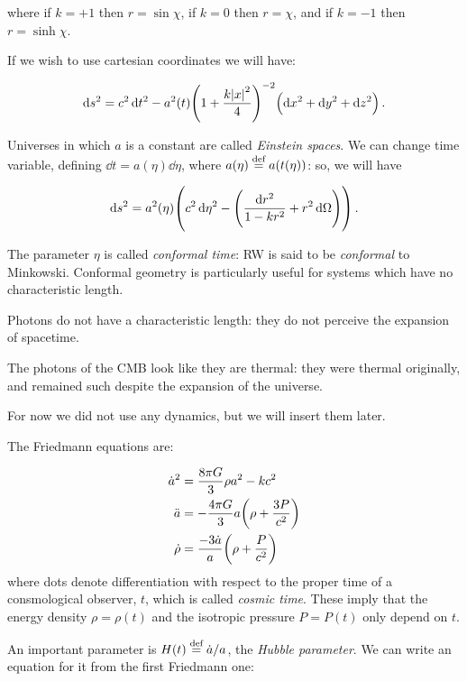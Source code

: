 \documentclass[main.tex]{subfiles}
\begin{document}
where if \(k = +1\)  then \(r = \sin \chi\), if \(k=0\)  then \(r=\chi\), and if \(k = -1\) then \(r = \sinh \chi\).

If we wish to use cartesian coordinates we will have:

\begin{equation}
  \dd{s^2} = c^2 \dd{t^2} - a^2 (t) \qty(1 + \frac{k \abs{x}^2}{4} )^{-2} \qty(\dd{x^2} + \dd{y^2} + \dd{z^2}) \,.
\end{equation}

Universes in which \(a\) is a constant are called \emph{Einstein spaces}.
We can change time variable, defining \(\dd{t} = a(\eta) \dd{\eta} \), where \(a(\eta) \stackrel{\text{def}}{=} a(t(\eta))\):  so, we will have

\begin{equation}
  \dd{s^2} = a^2 (\eta) \qty(c^2 \dd{\eta^2} - \qty(\frac{\dd{r^2}}{1 - kr^2} + r^2 \dd{\Omega})) \,.
\end{equation}

The parameter \(\eta\) is called \emph{conformal time}: RW is said to be \emph{conformal} to Minkowski.
Conformal geometry is particularly useful for systems which have no characteristic length.

Photons do not have a characteristic length: they do not perceive the expansion of spacetime.

The photons of the CMB look like they are thermal: they were thermal originally, and remained such despite the expansion of the universe.

For now we did not use any dynamics, but we will insert them later.

The Friedmann equations are:

\begin{subequations} \label{eq:friedmann-equations} 
\begin{align}
    \dot{a}^2 &= \frac{8 \pi G }{3} \rho a^2 - kc^2  \\
    \ddot{a} &= - \frac{4 \pi G }{3} a  \qty(\rho  + \frac{3P}{c^2} )  \\
    \dot{\rho} &= \frac{-3 \dot{a} }{a} \qty(\rho + \frac{P}{c^2} )
\end{align}
\end{subequations}
%
where dots denote differentiation with respect to the proper time of a consmological observer, \(t\), which is called \emph{cosmic time}.
These imply that the energy density \(\rho = \rho( t)\) and the isotropic pressure \(P = P(t)\) only depend on \(t\).

An important parameter is \(H(t) \stackrel{\text{def}}{=} \dot{a} / a\), the \emph{Hubble parameter}.
We can write an equation for it from the first Friedmann one:
\end{document}
